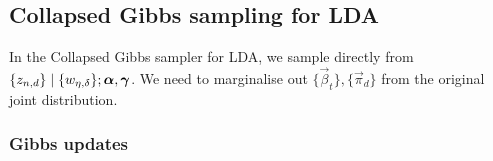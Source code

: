\subsection{Collapsed Gibbs sampling for LDA}
In the Collapsed Gibbs sampler for LDA, we sample directly from $\{z_{n, d}\} \mid \{w_{\eta, \delta}\}; \boldsymbol{\mathbf{\alpha}}, \boldsymbol{\mathbf{\gamma}}$. We need to marginalise out $\{\vec \beta_t\}, \{\vec \pi_d\}$ from the original joint distribution.





\subsubsection{Gibbs updates}
